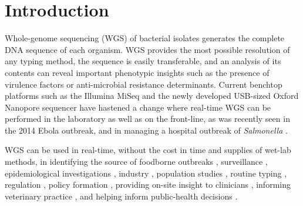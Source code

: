 \documentclass[doublespacing, linenumbers]{bmcart}
\begin{document}


\section*{Introduction}
Whole-genome sequencing (WGS) of bacterial isolates generates the complete DNA sequence of each organism. WGS provides the most possible resolution of any typing method, the sequence is easily transferable, and an analysis of its contents can reveal important phenotypic insights such as the presence of virulence factors or anti-microbial resistance determinants. Current benchtop platforms such as the Illumina MiSeq and the newly developed USB-sized Oxford Nanopore sequencer have hastened a change where real-time WGS can be performed in the laboratory as well as on the front-line, as was recently seen in the 2014 Ebola outbreak, and in managing a hospital outbreak of \textit{Salmonella} \cite{jones_technology:_2015,gilchrist_whole-genome_2015,birmingham_how_2015,quick_rapid_2015}. 

WGS can be used in real-time, without the cost in time and supplies of wet-lab methods, in identifying the source of foodborne outbreaks \cite{graham_real-time_2014}, surveillance \cite{zankari_genotyping_2013,cody_real-time_2013},  epidemiological investigations \cite{cody_real-time_2013}, industry \cite{andreevskaya_genome_2015,mazzaglia_pseudomonas_2012}, population studies \cite{nasser_evolutionary_2014,kopac_genomic_2014}, routine typing \cite{zhang_salmonella_2015}, regulation \cite{halachev_genomic_2014}, policy formation , providing on-site insight to clinicians \cite{grad_epidemiologic_2014,jr_next-generation_2012}, informing veterinary practice \cite{biek_whole_2012}, and helping inform public-health decisions \cite{lemke_stakeholder_2015}.
\end{document}
